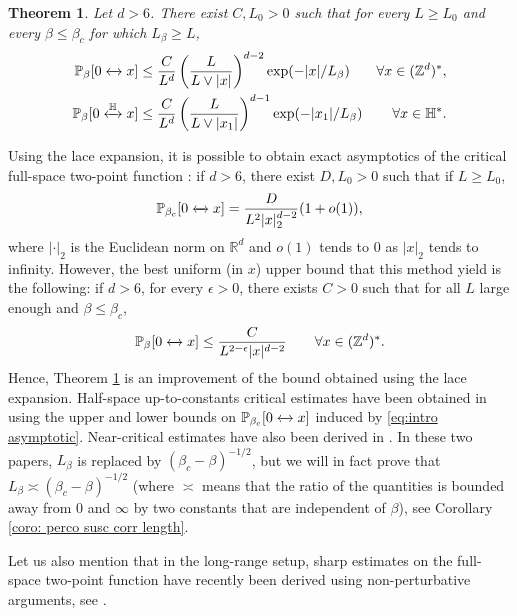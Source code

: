 \documentclass[11pt,a4paper]{article}
\numberwithin{equation}{section}
\theoremstyle{plain}
\newtheorem{Thm}{Theorem}[section]
\theoremstyle{definition}
\newcommand{\connect}{\xleftrightarrow}
\begin{document}
\begin{Thm}\label{thm:mainperco} Let $d>6$.
There exist $C,L_0>0$ such that for every $L\geq L_0$ and every $\beta\le\beta_c$ for which $L_\beta\geq L$,
\begin{align}
\label{eq:bound full plane perco}
\mathbb P_\beta[0\connect{}x]&\le \frac{C}{L^d}\left(\frac{L}{L\vee |x|}\right)^{d-2}\exp(-|x|/L_\beta) &\forall x\in (\mathbb Z^d)^*,\\
\label{eq:bound half plane perco} \mathbb P_\beta[0\connect{\mathbb H\:}x]&\le \frac{C}{L^d}\left(\frac{L}{L\vee |x_1|}\right)^{d-1}\exp(-|x_1|/L_\beta) &\forall x\in \mathbb H^*.
\end{align} 
\end{Thm}
Using the lace expansion, it is possible to obtain exact asymptotics of the critical full-space two-point function \cite{HaraSladevdHofstad2003PercoSO,LiuSlade2023Spreadout}: if $d>6$, there exist $D,L_0>0$ such that if $L\geq L_0$,
\begin{equation}\label{eq:intro asymptotic}
	\mathbb P_{\beta_c}[0\connect{}x]=\frac{D}{L^2|x|_2^{d-2}}(1+o(1)),
\end{equation}
where $|\cdot|_2$ is the Euclidean norm on $\mathbb R^d$ and $o(1)$ tends to $0$ as $|x|_2$ tends to infinity. However, the best uniform (in $x$) upper bound that this method yield is the following: if $d>6$, for every $\epsilon>0$, there exists $C>0$ such that for all $L$ large enough and $\beta\leq \beta_c$,
\begin{equation}
	\mathbb P_\beta[0\connect{}x]\leq \frac{C}{L^{2-\epsilon}|x|^{d-2}} \qquad \forall x\in(\mathbb Z^d)^*.
\end{equation}
Hence, Theorem \ref{thm:mainperco} is an improvement of the bound obtained using the lace expansion. Half-space up-to-constants critical estimates have been obtained in \cite{ChatterjeeHanson2020Halfspace} using the upper and lower bounds on $\mathbb P_{\beta_c}[0\connect{}x]$ induced by \eqref{eq:intro asymptotic}. 
 Near-critical estimates have also been derived in \cite{ChatterjeeHansonSosoe2023subcritical,HutchcroftMichtaSladePercolationTorusPlateau2023}. In these two papers, $L_\beta$ is replaced by $(\beta_c-\beta)^{-1/2}$, but we will in fact prove that $L_\beta\asymp (\beta_c-\beta)^{-1/2}$ (where $\asymp$ means that the ratio of the quantities is bounded away from $0$ and $\infty$ by two constants that are independent of $\beta$), see Corollary \ref{coro: perco susc corr length}.

Let us also mention that in the long-range setup, sharp estimates on the full-space two-point function have recently been derived using non-perturbative arguments, see \cite{hutchcroft2022sharp,hutchcroft2024pointwise}. 
\end{document}
